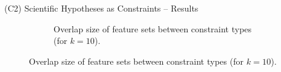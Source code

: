 \documentclass[en, navbarinline, handout]{sdqbeamer}
\begin{document}
\begin{frame}[t]{(C2) Scientific Hypotheses as Constraints -- Results}
\begin{figure}
\begin{subfigure}{0.48\textwidth}
			\caption*{Overlap size of feature sets between constraint types (for $k=10$).}
		\end{subfigure}
	\end{figure}
\end{frame}

\backupend
\end{document}
